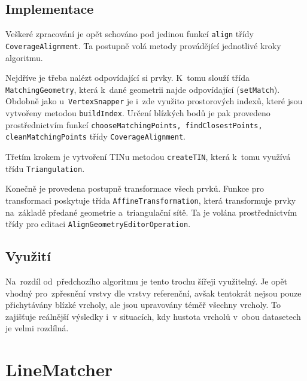 
\subsection{Implementace} %
\label{ca-implementace}
Veškeré zpracování je opět schováno pod jedinou funkcí \texttt{align} třídy
\texttt{Coverage\-Alignment}. Ta postupně volá metody provádějící jednotlivé
kroky algoritmu.

Nejdříve je třeba nalézt odpovídající si prvky. K~tomu slouží třída 
\texttt{Matching\-Geometry}, která k~dané geometrii najde odpovídající
(\texttt{set\-Match}). Obdobně jako u~\texttt{Vertex\-Snapper} je i~zde 
využito prostorových indexů, které jsou vytvořeny metodou 
\texttt{build\-Index}. Určení blízkých bodů je pak provedeno prostřednictvím
funkcí \texttt{choose\-Matching\-Points, \-find\-Closest\-Points,
\-clean\-Matching\-Points} třídy \texttt{Co\-ve\-ra\-ge\-Align\-ment}.

Třetím krokem je vytvoření TINu metodou \texttt{create\-TIN}, která k~tomu
využívá třídu \texttt{Tri\-an\-gu\-la\-tion}.  

Konečně je provedena postupně transformace všech prvků. Funkce pro
transformaci poskytuje třída \texttt{Affine\-Trans\-for\-mation},
která transformuje prvky na~základě předané geometrie a~triangulační
sítě. Ta je volána prostřednictvím třídy pro editaci 
\texttt{Align\-Geo\-metry\-Edi\-tor\-Ope\-ra\-tion}.


\subsection{Využití}
\label{ca-vyuziti}

Na~rozdíl od~předchozího algoritmu je tento trochu šířeji využitelný. Je opět 
vhodný pro~zpřesnění vrstvy dle vrstvy referenční, avšak tentokrát nejsou 
pouze přichytávány blízké vrcholy, ale jsou upravovány téměř všechny vrcholy. 
To zajišťuje reálnější výsledky i~v situacích, kdy hustota vrcholů v~obou 
datasetech je velmi rozdílná.



\section{LineMatcher}
\label{line matcher}

